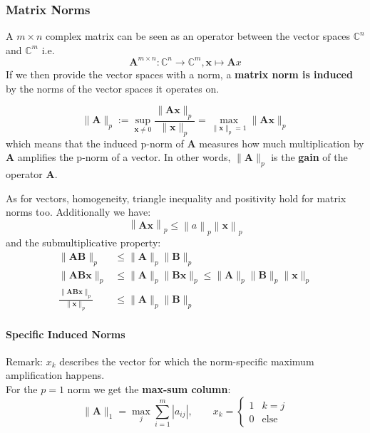 \subsubsection{Matrix Norms}
A $m\times n$ complex matrix can be seen as an operator between the vector spaces $\mathbb{C}^n$ and $\mathbb{C}^m$ i.e.
\begin{equation*}
    \mathbf{A}^{m\times n}:\mathbb{C}^n\to\mathbb{C}^m,\mathbf{x}\mapsto \mathbf{A}x
\end{equation*}
If we then provide the vector spaces with a norm, a \textbf{matrix norm is induced} by the norms of the vector spaces it operates on.

\begin{equation*}
    \|\mathbf{A}\|_p:=\sup_{\mathbf{x}\neq0}\frac{\|\mathbf{Ax}\|_p}{\|\mathbf{x}\|_p}=\max_{\|\mathbf{x}\|_p=1}\|\mathbf{Ax}\|_p
\end{equation*}
which means that the induced p-norm of $\mathbf{A}$ measures how much multiplication by $\mathbf{A}$ amplifies the p-norm of a vector. In other words, $\|\mathbf{A}\|_p$ is the \textbf{gain} of the operator $\mathbf{A}$.

\newpar{}

As for vectors, homogeneity, triangle inequality and positivity hold for matrix norms too. Additionally we have:
\begin{equation*}
    \left\|\mathbf{Ax}\right\|_p\leq\left\|a\right\|_p\left\|\mathbf{x}\right\|_p
\end{equation*}
and the submultiplicative property:
\begin{align*}
    \|\mathbf{AB}\|_p                                     & \leq\|\mathbf{A}\|_p\|\mathbf{B}\|_p                                                      \\
    \|\mathbf{AB} \mathbf{x}\|_p                          & \leq\|\mathbf{A}\|_p\|\mathbf{Bx}\|_p\leq\|\mathbf{A}\|_p\|\mathbf{B}\|_p\|\mathbf{x}\|_p \\
    \frac{\|\mathbf{AB} \mathbf{x}\|_p}{\|\mathbf{x}\|_p} & \leq\|\mathbf{A}\|_p\|\mathbf{B}\|_p
\end{align*}


\paragraph{Specific Induced Norms}
Remark: $x_k$ describes the vector for which the norm-specific maximum amplification happens.\\
For the $p = 1$ norm we get the \textbf{max-sum column}:
\begin{equation*}
    \|\mathbf{A}\|_1=\max_j\sum_{i=1}^m|a_{ij}|,\qquad x_k=\begin{cases}
        1 & k=j         \\
        0 & \text{else}
    \end{cases}
\end{equation*}


